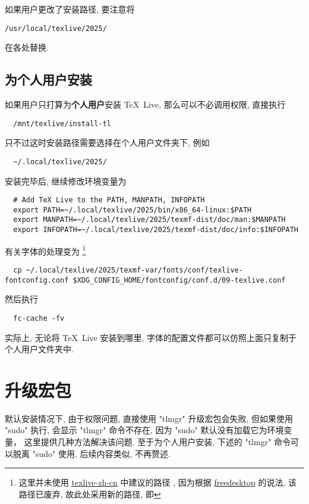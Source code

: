 如果用户更改了安装路径,
要注意将
\begin{lstlisting}[language = {}]
  /usr/local/texlive/2025/
\end{lstlisting}
在各处替换.

\subsection{为个人用户安装}\label{subsec:ubuntu-user-folder}

如果用户只打算为\textbf{个人用户}安装 \TeX~Live,
那么可以不必调用权限,
直接执行
\begin{lstlisting}
  /mnt/texlive/install-tl
\end{lstlisting}
只不过这时安装路径需要选择在个人用户文件夹下,
例如
\begin{lstlisting}
  ~/.local/texlive/2025/
\end{lstlisting}
安装完毕后,
继续修改环境变量为
\begin{lstlisting}
  # Add TeX Live to the PATH, MANPATH, INFOPATH
  export PATH=~/.local/texlive/2025/bin/x86_64-linux:$PATH
  export MANPATH=~/.local/texlive/2025/texmf-dist/doc/man:$MANPATH
  export INFOPATH=~/.local/texlive/2025/texmf-dist/doc/info:$INFOPATH
\end{lstlisting}
有关字体的处理变为%
\footnote{这里并未使用
\href{https://tug.org/texlive/doc/texlive-zh-cn/texlive-zh-cn.pdf}{\textsf{texlive-zh-cn}}
中建议的路径 ,
因为根据 \href{https://www.freedesktop.org/software/fontconfig/fontconfig-user.html}{freedesktop} 的说法,
该路径已废弃,
故此处采用新的路径,
即 }
\begin{lstlisting}
  cp ~/.local/texlive/2025/texmf-var/fonts/conf/texlive-fontconfig.conf $XDG_CONFIG_HOME/fontconfig/conf.d/09-texlive.conf
\end{lstlisting}
然后执行
\begin{lstlisting}
  fc-cache -fv
\end{lstlisting}
实际上,
无论将 \TeX~Live 安装到哪里,
字体的配置文件都可以仿照上面只复制于个人用户文件夹中.

\section{升级宏包}\label{sec:ubuntu:update}

默认安装情况下,
由于权限问题,
直接使用 "tlmgr" 升级宏包会失败,
但如果使用 "sudo" 执行,
会显示 "tlmgr" 命令不存在,
因为 "sudo" 默认没有加载它为环境变量，
这里提供几种方法解决该问题.
至于为个人用户安装,
下述的 "tlmgr" 命令可以脱离 "sudo" 使用.
后续内容类似,
不再赘述.


